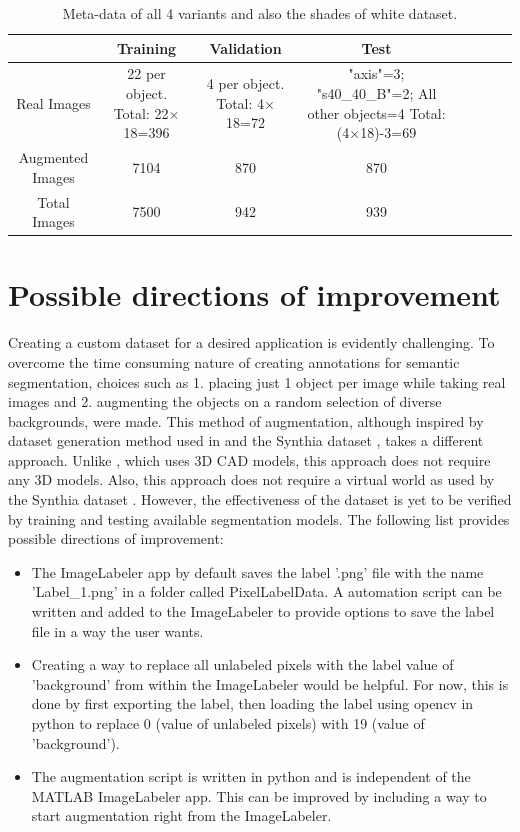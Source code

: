 \begin{table}[!htb]
	\centering
	\begin{tabular}{|c|c|c|c|c|c|c|c|}
	\hline 
    & Training & Validation & Test \\ 
	\hline 
	Real Images & \makecell{22 per object.\\ Total: 22$\times$18=396} & \makecell{4 per object.\\ Total: 4$\times$18=72} & 				\makecell{"axis"=3; \\"s40\_40\_B"=2; \\All other objects=4\\ Total: (4$\times$18)-3=69} \\ 
	\hline 
	Augmented Images & 7104 & 870 & 870 \\ 
	\hline 
	Total Images & 7500 & 942 & 939 \\ 
	\hline 
	\end{tabular}
	\caption{Meta-data of all 4 variants and also the shades of white dataset.} 
	\label{Table:meta}
\end{table}

\section{Possible directions of improvement}

Creating a custom dataset for a desired application is evidently challenging. To overcome the time consuming nature of creating annotations for semantic segmentation, choices such as 1. placing just 1 object per image while taking real images and 2. augmenting the objects on a random selection of diverse backgrounds, were made. This method of augmentation, although inspired by dataset generation method used in \cite{DBLP:journals/corr/abs-1709-00849} and the Synthia dataset \cite{RosCVPR16}, takes a different approach. Unlike \cite{DBLP:journals/corr/abs-1709-00849}, which uses 3D CAD models, this approach does not require any 3D models. Also, this approach does not require a virtual world as used by the Synthia dataset \cite{RosCVPR16}. However, the effectiveness of the dataset is yet to be verified by training and testing available segmentation models.
The following list provides possible directions of improvement:
	\begin{itemize}
		\item The ImageLabeler app by default saves the label '.png' file with the name 'Label\_1.png' in a folder called PixelLabelData. A automation script can be written and added to the ImageLabeler to provide options to save the label file in a way the user wants.
		\item Creating a way to replace all unlabeled pixels with the label value of 'background' from within the ImageLabeler would be helpful. For now, this is done by first exporting the label, then loading the label using opencv in python to replace 0 (value of unlabeled pixels) with 19 (value of 'background').
		\item The augmentation script is written in python and is independent of the MATLAB ImageLabeler app. This can be improved by including a way to start augmentation right from the ImageLabeler.
	\end{itemize}

